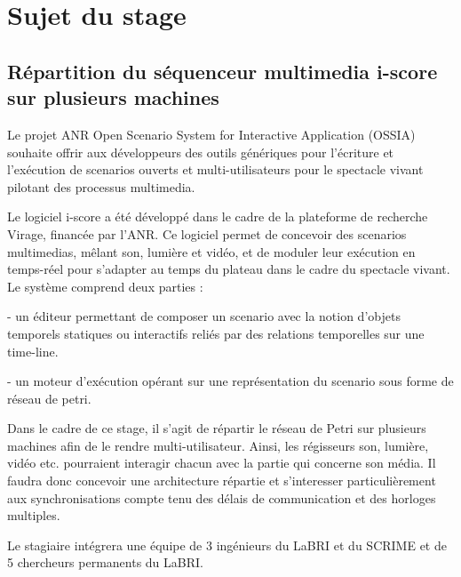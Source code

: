 \let\cleardoublepage\clearpage
\appendix
	\let\cleardoublepage\clearpage
	\chapter{Sujet du stage}
	\let\cleardoublepage\clearpage
	\label{apx.SujetStage}
	\section*{Répartition du séquenceur multimedia i-score sur plusieurs machines}
	
	Le projet ANR Open Scenario System for Interactive Application (OSSIA)
	souhaite offrir aux développeurs des outils génériques pour l'écriture
	et l'exécution de scenarios ouverts et multi-utilisateurs pour le
	spectacle vivant pilotant des processus multimedia.
	
	Le logiciel i-score a été développé dans le cadre de la plateforme de
	recherche Virage, financée par l'ANR. Ce logiciel permet de concevoir
	des scenarios multimedias, mêlant son, lumière et vidéo, et de moduler
	leur exécution en temps-réel pour s'adapter au temps du plateau dans
	le cadre du spectacle vivant. Le système comprend deux parties :
	
	- un éditeur permettant de composer un scenario avec la notion
	d'objets temporels statiques ou interactifs reliés par des relations
	temporelles sur une time-line.
	
	- un moteur d'exécution opérant sur une représentation du scenario
	sous forme de réseau de petri.
	
	Dans le cadre de ce stage, il s'agit de répartir le réseau de Petri
	sur plusieurs machines afin de le rendre multi-utilisateur. Ainsi, les
	régisseurs son, lumière, vidéo etc. pourraient interagir chacun avec
	la partie qui concerne son média. Il faudra donc concevoir une
	architecture répartie et s'interesser particulièrement aux
	synchronisations compte tenu des délais de communication et des
	horloges multiples.
	
	Le stagiaire intégrera une équipe de 3 ingénieurs du LaBRI et du
	SCRIME et de 5 chercheurs permanents du LaBRI.
	\let\cleardoublepage\clearpage
